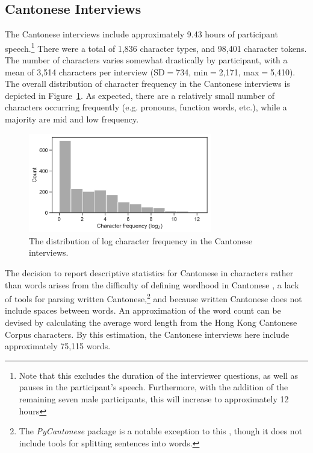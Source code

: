 \subsection{Cantonese Interviews}\label{ch2:subsec:cantonese_descriptive}
The Cantonese interviews include approximately 9.43 hours of participant speech.\footnote{Note that this excludes the duration of the interviewer questions, as well as pauses in the participant's speech. Furthermore, with the addition of the remaining seven male participants, this will increase to approximately 12 hours} There were a total of 1,836 character types, and 98,401 character tokens. The number of characters varies somewhat drastically by participant, with a mean of 3,514 characters per interview (SD$=$734, min$=$2,171, max$=$5,410). The overall distribution of character frequency in the Cantonese interviews is depicted in Figure~\ref{ch2:fig:ccf}. As expected, there are a relatively small number of characters occurring frequently (e.g. pronouns, function words, etc.), while a majority are mid and low frequency. 

\begin{figure}[!htbp]
\begin{center}
\includegraphics[width=8cm]{figures/2-can_char_frequency.png} 
\caption{The distribution of log character frequency in the Cantonese interviews.}
\label{ch2:fig:ccf}
\end{center}
\end{figure}

The decision to report descriptive statistics for Cantonese in characters rather than words arises from the difficulty of defining wordhood in Cantonese \citep{wong_2006_fusion}, a lack of tools for parsing written Cantonese,\footnote{The \textit{PyCantonese} package is a notable exception to this \citep{lee_2018_pycantonese}, though it does not include tools for splitting sentences into words.} and because written Cantonese does not include spaces between words. An approximation of the word count can be devised by calculating the average word length from the Hong Kong Cantonese Corpus \citep{luke_2015_hkc} characters. By this estimation, the Cantonese interviews here include approximately 75,115 words.

